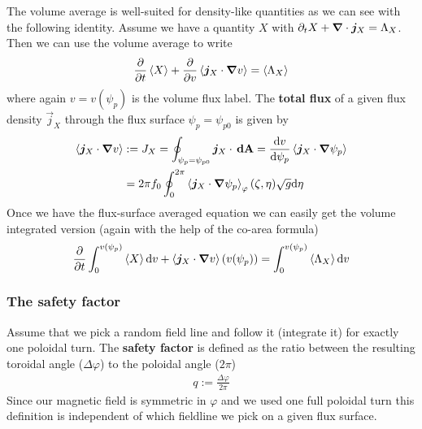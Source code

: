 The volume average is well-suited for density-like quantities
as we can see with the following identity.
Assume we have a quantity $X$ with $\partial_t X + {\boldsymbol{\nabla}}\cdot {\boldsymbol{j}}_X = \Lambda_X$.
Then we can use the volume average to write
\begin{align}
\frac{\partial}{\partial t} \left \langle X  \right \rangle + \frac{\partial}{
  \partial v} \left \langle  {\boldsymbol{j}}_X\cdot{\boldsymbol{\nabla}} v \right \rangle  = \left \langle  \Lambda_X \right \rangle
\label{eq:fsa_balance}
\end{align}
where again $v=v(\psi_p)$ is the volume flux label.
The {\bf total flux} of a given flux density $\vec j_X$ through the
flux surface $\psi_p = \psi_{p0}$ is given by
\begin{align}
\left \langle {\boldsymbol{j}}_X\cdot{\boldsymbol{\nabla}} v \right \rangle &:= J_X=\oint_{\psi_p=\psi_{p0}} {\boldsymbol{j}}_X\cdot {\boldsymbol{\,\mathrm{dA}}} =
 \frac{\mathrm{d} v}{\mathrm{d}\psi_p} \left \langle  {\boldsymbol{j}}_X\cdot{\boldsymbol{\nabla}}\psi_p  \right \rangle\\
 &=
   2\pi f_0 \oint_0^{2\pi} \left \langle  {\boldsymbol{j}}_X\cdot{\boldsymbol{\nabla}}\psi_p \right\rangle_\varphi(\zeta,\eta) \sqrt{g}\mathrm{d}\eta
\label{eq:total_flux}
\end{align}
Once we have the flux-surface averaged equation we can easily get the volume integrated version (again with the help of the co-area formula)
\begin{align}
\frac{\partial}{\partial t} \int_0^{v(\psi_p)}\left \langle X \right \rangle \mathrm{d} v 
+ \left \langle  {\boldsymbol{j}}_X\cdot{\boldsymbol{\nabla}} v \right \rangle(v(\psi_p))  = \int_0^{v(\psi_p)}\left \langle  \Lambda_X \right \rangle\mathrm{d} v
\label{eq:integral_balance}
\end{align}

\subsubsection{The safety factor}
Assume that we pick a random field line and follow it (integrate it) for exactly one
poloidal turn. The {\bf safety factor} is defined as the ratio between
the resulting toroidal angle ($\Delta\varphi$) to the poloidal angle ($2\pi$)
\begin{align}
q := \frac{\Delta\varphi}{2\pi}
\label{}
\end{align}
Since our magnetic field is symmetric in $\varphi$ and we used one
full poloidal turn this definition is independent of which
fieldline we pick on a given flux surface.

